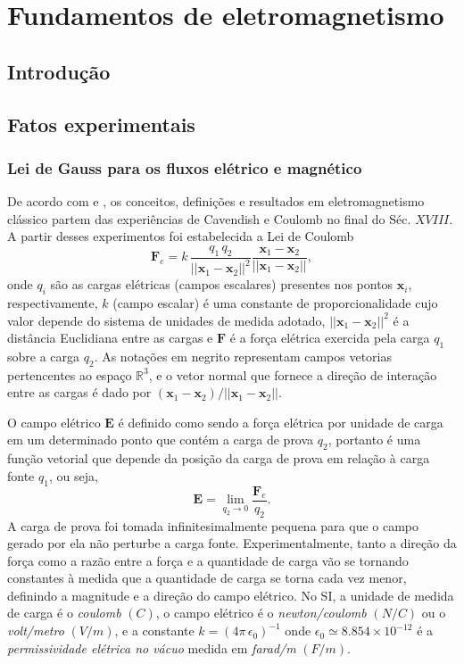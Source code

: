 \chapter{Fundamentos de eletromagnetismo}\label{sec.fund_eletr}

\section{Introdução}

\section{Fatos experimentais}

\subsection{Lei de Gauss para os fluxos elétrico e magnético}\label{sec.lei_gauss}
De acordo com \cite{jackson_classical_1999} e \cite{sommerfeld_52} , os conceitos, definições e resultados em eletromagnetismo clássico partem das experiências de Cavendish e Coulomb no final do Séc. $XVIII$. A partir desses experimentos foi estabelecida a Lei de Coulomb
\begin{equation}\label{eq.forc_elet}
\textbf{F}_e=k\,\frac{q_1\,q_2}{||\textbf{x}_1-\textbf{x}_2||^2}\frac{\textbf{x}_1-\textbf{x}_2}{||\textbf{x}_1-\textbf{x}_2||},
\end{equation}
onde $q_i$ são as cargas elétricas (campos escalares) presentes nos pontos $\textbf{x}_i$, respectivamente, $k$ (campo escalar) é uma constante de proporcionalidade cujo valor depende do sistema de unidades de medida adotado, $||\textbf{x}_1-\textbf{x}_2||^2$ é a distância Euclidiana entre as cargas e $\textbf{F}$ é a força elétrica exercida pela carga $q_1$ sobre a carga $q_2$. As notações em negrito representam campos vetorias pertencentes ao espaço $\mathbb{R}^3$, e o vetor normal que fornece a direção de interação entre as cargas é dado por $(\textbf{x}_1-\textbf{x}_2)/||\textbf{x}_1-\textbf{x}_2||$.

O campo elétrico $\textbf{E}$ é definido como sendo a força elétrica por unidade de carga em um determinado ponto que contém a carga de prova $q_2$, portanto é uma função vetorial que depende da posição da carga de prova em relação à carga fonte $q_1$, ou seja,
\begin{equation}\label{eq.camp_elet}
\textbf{E}=\lim_{q_2\to 0}\frac{\textbf{F}_e}{q_2}.
\end{equation}
A carga de prova foi tomada infinitesimalmente pequena para que o campo gerado por ela não perturbe a carga fonte. Experimentalmente, tanto a direção da força como a razão entre a força e a quantidade de carga vão se tornando constantes à medida que a quantidade de carga se torna cada vez menor, definindo a magnitude e a direção do campo elétrico. No SI, a unidade de medida de carga é o \textit{coulomb} $(C)$, o campo elétrico é o \textit{newton/coulomb} $(N/C)$ ou o \textit{volt/metro} $(V/m)$, e a constante $k=(4\pi\,\epsilon_0)^{-1}$ onde $\epsilon_0\simeq8.854\times10^{-12}$ é a \textit{permissividade elétrica no vácuo} medida em \textit{farad/m} $(F/m)$.

